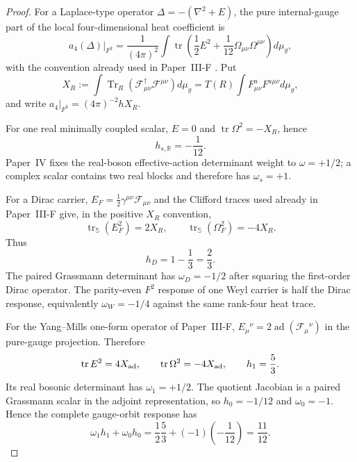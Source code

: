 \documentclass[12pt,a4paper]{article}
\begin{document}
\begin{proof}

For a Laplace-type operator
$\Delta=-(\nabla^2+E)$, the pure internal-gauge part of the local
four-dimensional heat coefficient is
\begin{equation}
\label{p5:eq:v2140-a4-gauge-piece}
 a_4(\Delta)\big|_{F^2}
 =\frac1{(4\pi)^2}\int
 \operatorname{tr}\!\left(\frac12E^2+\frac1{12}\Omega_{\mu\nu}\Omega^{\mu\nu}\right)d\mu_g,
\end{equation}
with the convention already used in Paper~III-F
\cite{Vassilevich2003HeatKernel}.  Put
\[
 X_R:=\int\operatorname{Tr}_R(\mathcal F_{\mu\nu}^{\dagger}
 \mathcal F^{\mu\nu})d\mu_g
 =T(R)\int F^a_{\mu\nu}F^{a\mu\nu}d\mu_g,
\]
and write
$a_4|_{F^2}=(4\pi)^{-2}hX_R$.

For one real minimally coupled scalar, $E=0$ and
$\operatorname{tr}\Omega^2=-X_R$, hence
\[
 h_{s,\mathbb R}=-\frac1{12}.
\]
Paper~IV fixes the real-boson effective-action determinant weight to
$\omega=+1/2$; a complex scalar contains two real blocks and therefore has
$\omega_s=+1$.

For a Dirac carrier,
$E_F=\tfrac12\gamma^{\mu\nu}\mathcal F_{\mu\nu}$ and the Clifford traces used
already in Paper~III-F give, in the positive $X_R$ convention,
\[
 \operatorname{tr}_{\mathbb S}(E_F^2)=2X_R,
 \qquad
 \operatorname{tr}_{\mathbb S}(\Omega_F^2)=-4X_R.
\]
Thus
\[
 h_D=1-\frac13=\frac23.
\]
The paired Grassmann determinant has $\omega_D=-1/2$ after squaring the
first-order Dirac operator.  The parity-even $F^2$ response of one Weyl
carrier is half the Dirac response, equivalently $\omega_W=-1/4$ against the
same rank-four heat trace.

For the Yang--Mills one-form operator of Paper~III-F,
$E_\mu{}^\nu=2\operatorname{ad}(\mathcal F_\mu{}^\nu)$ in the pure-gauge
projection.  Therefore
\[
 \operatorname{tr}E^2=4X_{\rm ad},\qquad
 \operatorname{tr}\Omega^2=-4X_{\rm ad},\qquad
 h_1=\frac53.
\]
Its real bosonic determinant has $\omega_1=+1/2$.  The quotient Jacobian is a
paired Grassmann scalar in the adjoint representation, so
$h_0=-1/12$ and $\omega_0=-1$.  Hence the complete gauge-orbit response has
\begin{equation}
\label{p5:eq:v2140-gauge-11-12}
 \boxed{
 \omega_1h_1+\omega_0h_0
 =\frac12\frac53+(-1)\!\left(-\frac1{12}\right)
 =\frac{11}{12}.}
\end{equation}


\end{proof}
\end{document}
